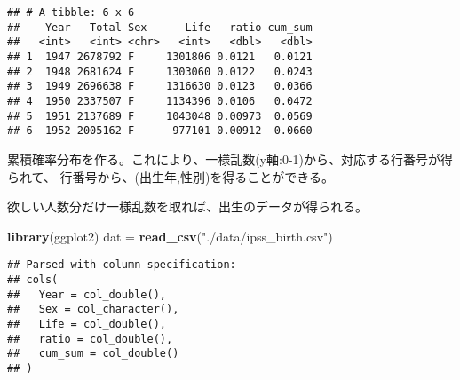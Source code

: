 \documentclass[
]{book}
\newenvironment{Shaded}{\begin{snugshade}}{\end{snugshade}}
\newcommand{\DataTypeTok}[1]{\textcolor[rgb]{0.13,0.29,0.53}{#1}}
\newcommand{\KeywordTok}[1]{\textcolor[rgb]{0.13,0.29,0.53}{\textbf{#1}}}
\newcommand{\NormalTok}[1]{#1}
\newcommand{\OperatorTok}[1]{\textcolor[rgb]{0.81,0.36,0.00}{\textbf{#1}}}
\newcommand{\OtherTok}[1]{\textcolor[rgb]{0.56,0.35,0.01}{#1}}
\newcommand{\StringTok}[1]{\textcolor[rgb]{0.31,0.60,0.02}{#1}}
\begin{document}
\begin{verbatim}
## # A tibble: 6 x 6
##    Year   Total Sex      Life   ratio cum_sum
##   <int>   <int> <chr>   <int>   <dbl>   <dbl>
## 1  1947 2678792 F     1301806 0.0121   0.0121
## 2  1948 2681624 F     1303060 0.0122   0.0243
## 3  1949 2696638 F     1316630 0.0123   0.0366
## 4  1950 2337507 F     1134396 0.0106   0.0472
## 5  1951 2137689 F     1043048 0.00973  0.0569
## 6  1952 2005162 F      977101 0.00912  0.0660
\end{verbatim}

\begin{Shaded}
\end{Shaded}

累積確率分布を作る。これにより、一様乱数(y軸:0-1)から、対応する行番号が得られて、
行番号から、(出生年,性別)を得ることができる。

欲しい人数分だけ一様乱数を取れば、出生のデータが得られる。

\begin{Shaded}
\begin{Highlighting}[]
\KeywordTok{library}\NormalTok{(ggplot2)}
\NormalTok{dat =}\StringTok{ }\KeywordTok{read_csv}\NormalTok{(}\StringTok{"./data/ipss_birth.csv"}\NormalTok{)}
\end{Highlighting}
\end{Shaded}

\begin{verbatim}
## Parsed with column specification:
## cols(
##   Year = col_double(),
##   Sex = col_character(),
##   Life = col_double(),
##   ratio = col_double(),
##   cum_sum = col_double()
## )
\end{verbatim}
\end{document}
